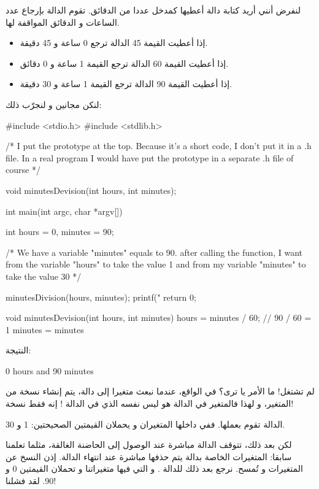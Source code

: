 لنفرض أنني أريد كتابة دالة أعطيها كمدخل عددا من الدقائق. تقوم الدالة بإرجاع عدد الساعات و الدقائق المواقفة لها.

\begin{itemize}
  \item إذا أعطيت القيمة 45  الدالة ترجع 0 ساعة و 45 دقيقة.
  \item إذا أعطيت القيمة 60 الدالة ترجع القيمة  1 ساعة و 0 دقائق.
	\item إذا أعطيت القيمة 90 الدالة ترجع القيمة  1 ساعة و 30 دقيقة.
\end{itemize}

لنكن مجانين و لنجرّب ذلك:

\begin{Csource}
#include <stdio.h>
#include <stdlib.h>

/* I put the prototype at the top.
Because it's a short code, I don't put it in a .h file.
In a real program I would have put the prototype
in a separate .h file of course */

void minutesDevision(int hours, int minutes);

int main(int argc, char *argv[])
{
	int hours = 0, minutes = 90;

/* We have a variable "minutes" equals to 90.
   after calling the function, I want from the variable
   "hours" to take the value 1 and from my variable
   "minutes" to take the value 30 */

	minutesDivision(hours, minutes);
	printf("%
	return 0;
}

void minutesDevision(int hours, int minutes)
{
	hours = minutes / 60;  // 90 / 60 = 1
	minutes = minutes %
}
\end{Csource}

النتيجة:

\begin{Console}
0 hours and 90 minutes
\end{Console}

لم تشتغل! ما الأمر يا ترى؟
في الواقع، عندما نبعث متغيرا إلى دالة، يتم إنشاء نسخة من المتغير، و لهذا فالمتغير
في الدالة
هو ليس نفسه الذي في الدالة
!
إنه فقط نسخة!

الدالة
تقوم بعملها. ففي داخلها المتغيران
و
يحملان القيمتين الصحيحتين: 1 و 30.

لكن بعد ذلك، تتوقف الدالة مباشرة عند الوصول إلى الحاضنة الغالقة، مثلما تعلمنا سابقا: المتغيرات الخاصة بدالة يتم حذفها مباشرة عند انتهاء الدالة. إذن النسخ عن المتغيرات
و
تُمسح.
نرجع بعد ذلك للدالة
.
و التي فيها متغيراتنا
و
تحملان القيمتين 0 و 90. لقد فشلنا!

